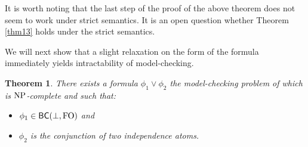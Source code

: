 \documentclass{article}
\theoremstyle{plain}
\newtheorem{theorem}{Theorem}
\theoremstyle{definition}
\newcommand{\np}{{\rm NP}}
\begin{document}
It is worth noting that the last step of the proof of the above theorem does not seem to  work  under strict semantics. It is an open question whether Theorem \ref{thm13} holds under the strict semantics.

We will next show that a slight relaxation on the form of the formula immediately yields intractability 
of model-checking.
\begin{theorem}
There exists a formula $\phi_1\vee \phi_2$ the model-checking problem of which is $\np$-complete and such that:

\begin{itemize}
    \item $\phi_1\in\mathsf{BC}(\bot,{\rm FO})$ and
    \item $\phi_2$ is the conjunction of \textit{two} independence atoms.
\end{itemize} 
\end{theorem}
\end{document}
